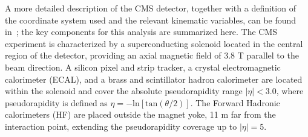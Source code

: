 A more detailed description of the CMS detector, together with a definition of the coordinate system used and the relevant kinematic variables, can be found in~\cite{CMS}; the key components for this analysis are summarized here. The CMS experiment is characterized by a superconducting solenoid located in the central region of
the detector, providing an axial magnetic field of 3.8 T parallel to the beam direction. A silicon pixel and strip tracker, a crystal electromagnetic calorimeter (ECAL), and a brass and scintillator hadron calorimeter are located within the solenoid and cover the absolute pseudorapidity range $|\eta| < 3.0$, where pseudorapidity is defined as $\eta = - \mathrm{ln}[\mathrm{tan}(\theta/2)]$. The Forward Hadronic calorimeters (HF) are placed outside the magnet yoke, 11 m far from the interaction point, extending the pseudorapidity coverage up to $|\eta|= 5$. \\

